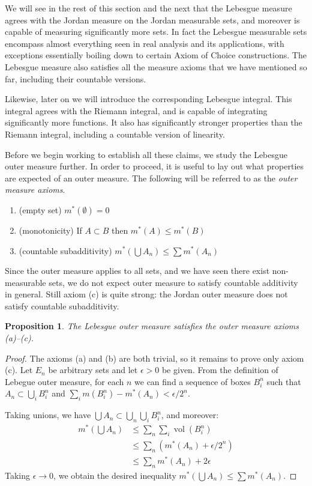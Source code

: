 \documentclass[11pt,oneside]{amsbook}
\DeclareMathOperator{\vol}{vol}
\theoremstyle{definition}
\theoremstyle{plain}
\newtheorem{prop}[thm]{Proposition}
\theoremstyle{definition}
\theoremstyle{remark}
\numberwithin{equation}{section}
\numberwithin{figure}{section}
\begin{document}
We will see in the rest of this section and the next that the Lebesgue measure agrees with the Jordan measure on the Jordan measurable sets, and moreover is capable of measuring significantly more sets. In fact the Lebesgue measurable sets encompass almost everything seen in real analysis and its applications, with exceptions essentially boiling down to certain Axiom of Choice constructions. The Lebesgue measure also satisfies all the measure axioms that we have mentioned so far, including their countable versions.

Likewise, later on we will introduce the corresponding Lebesgue integral. This integral agrees with the Riemann integral, and is capable of integrating significantly more functions. It also has significantly stronger properties than the Riemann integral, including a countable version of linearity.

Before we begin working to establish all these claims, we study the Lebesgue outer measure further. In order to proceed, it is useful to lay out what properties are expected of an outer measure. The following will be referred to as the \emph{outer measure axioms}.
\begin{enumerate}
\item (empty set) $m^*(\emptyset)=0$
\item (monotonicity) If $A\subset B$ then $m^*(A)\leq m^*(B)$
\item (countable subadditivity) $m^*(\bigcup A_n)\leq\sum m^*(A_n)$
\end{enumerate}
Since the outer measure applies to all sets, and we have seen there exist non-measurable sets, we do not expect outer measure to satisfy countable additivity in general. Still axiom (c) is quite strong: the Jordan outer measure does not satisfy countable subadditivity.

\begin{prop}
  The Lebesgue outer measure satisfies the outer measure axioms (a)--(c).
\end{prop}

\begin{proof}
  The axioms (a) and (b) are both trivial, so it remains to prove only axiom (c). Let $E_n$ be arbitrary sets and let $\epsilon>0$ be given. From the definition of Lebegue outer measure, for each $n$ we can find a sequence of boxes $B_i^n$ such that $A_n\subset\bigcup_iB_i^n$ and $\sum_im(B_i^n)-m^*(A_n)<\epsilon/2^n$.

  Taking unions, we have $\bigcup A_n\subset\bigcup_n\bigcup_iB_i^n$, and moreover:
  \begin{align*}
    m^*(\bigcup A_n)&\leq\sum_n\sum_i\vol(B_i^n)\\
                    &\leq\sum_n\left(m^*(A_n)+\epsilon/2^n\right)\\
                    &\leq\sum_nm^*(A_n)+2\epsilon
  \end{align*}
  Taking $\epsilon\to0$, we obtain the desired inequality $m^*(\bigcup A_n)\leq\sum m^*(A_n)$.
\end{proof}
\end{document}
